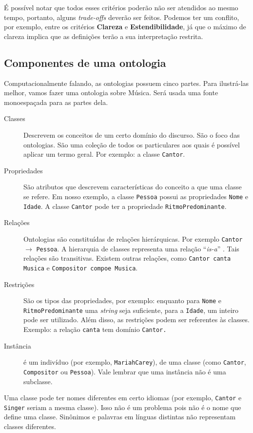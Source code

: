 É possível notar que todos esses critérios poderão não ser atendidos ao mesmo tempo, portanto, alguns \textit{trade-offs} deverão ser feitos.
Podemos ter um conflito, por exemplo, entre os critérios \textbf{Clareza} e \textbf{Estendibilidade}, já que o máximo de clareza implica que as definições terão a sua interpretação restrita.

\subsection{Componentes de uma ontologia}

Computacionalmente falando, as ontologias possuem cinco partes. Para ilustrá-las melhor, vamos fazer uma ontologia sobre Música. Será usada uma fonte monoespaçada para as partes dela.

\begin{description}
	\item[Classes] Descrevem os conceitos de um certo domínio do discurso. São o foco das ontologias. São uma coleção de todos os particulares aos quais é possível aplicar um termo geral. Por exemplo: a classe \texttt{Cantor}.
	\item[Propriedades] São atributos que descrevem características do conceito a que uma classe se refere. Em nosso exemplo, a classe \texttt{Pessoa} possui as propriedades \texttt{Nome} e \texttt{Idade}. A classe \texttt{Cantor} pode ter a propriedade \texttt{RitmoPredominante}.
	\item[Relações] Ontologias são constituídas de relações hierárquicas. Por exemplo \texttt{Cantor} $ \to $ \texttt{Pes\-so\-a}. A hierarquia de classes representa uma relação “\textit{is-a}” \citep{ontoFranca}. Tais relações são transitivas. Existem outras relações, como \texttt{Cantor canta Musica} e \texttt{Compositor compoe Musica}.
	\item[Restrições] São os tipos das propriedades, por exemplo: enquanto para \texttt{Nome} e \texttt{Ritmo\-Pre\-do\-mi\-nan\-te} uma \textit{string} seja suficiente, para a \texttt{Idade}, um inteiro pode ser utilizado. Além disso, as restrições podem ser referentes às classes. Exemplo: a relação \texttt{canta} tem domínio \texttt{Cantor.}
	\item[Instância] é um indivíduo (por exemplo, \texttt{MariahCarey}), de uma classe (como \texttt{Cantor}, \texttt{Com\-po\-si\-tor} ou \texttt{Pessoa}). Vale lembrar que uma instância não é uma subclasse.
\end{description}

Uma classe pode ter nomes diferentes em certo idiomas (por exemplo, \texttt{Cantor} e \texttt{Singer} seriam a mesma classe). Isso não é um problema pois não é o nome que define uma classe. Sinônimos e palavras em línguas distintas não representam classes diferentes.

